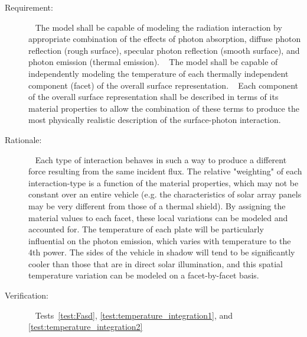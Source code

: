 \label{reqt:functional_interaction}
\begin{description}
  \item[Requirement:]\ \newline
    The model shall be capable of modeling the radiation interaction by appropriate
    combination of the effects of photon
    absorption, diffuse photon reflection (rough surface), specular photon
    reflection (smooth surface), and photon emission (thermal emission).
    \ \newline
      The model shall be capable of independently modeling the temperature of each
      thermally independent
      component (facet) of the overall surface representation.
    \ \newline
      Each component of the overall surface representation shall be described
      in terms of its material properties to allow
      the combination of these terms to produce the most physically realistic
      description of the surface-photon interaction.
  \item[Rationale:]\ \newline
    Each type of interaction behaves in such a way to produce a different force
    resulting from the same incident flux.  The relative "weighting" of each
    interaction-type is a function of the material properties, which may not be
    constant over an entire vehicle (e.g. the characteristics of solar array panels may be very
    different from those of a thermal shield).  By assigning the material values to each
    facet, these local variations can be modeled and accounted for.
    The temperature of each plate will be particularly influential on the
    photon
    emission, which varies with temperature to the 4th power.  The sides of the
    vehicle in shadow will tend to be significantly cooler than those that are
    in direct solar illumination, and this spatial temperature variation can be
    modeled on a facet-by-facet basis.
  \item[Verification:]\ \newline
    Tests~\vref{test:Fasd}, \vref{test:temperature_integration1}, and \vref{test:temperature_integration2}
\end{description}



